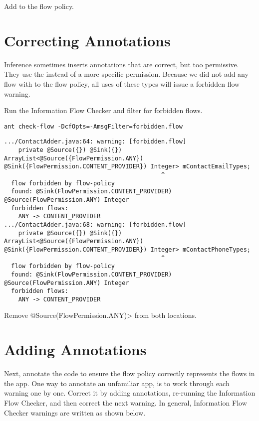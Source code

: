 Add   to the flow policy.

\section{Correcting Annotations}
Inference sometimes inserts annotations that are correct, but too permissive.  
They use the  instead of a more specific permission.  Because we did
not add any flow with  to the flow policy, all uses of these types will 
issue a forbidden flow warning.  

Run the Information Flow Checker and filter for forbidden flows.

\begin{Verbatim}
ant check-flow -DcfOpts=-AmsgFilter=forbidden.flow
\end{Verbatim}

\begin{Verbatim}
.../ContactAdder.java:64: warning: [forbidden.flow]
    private @Source({}) @Sink({}) ArrayList<@Source({FlowPermission.ANY}) @Sink({FlowPermission.CONTENT_PROVIDER}) Integer> mContactEmailTypes;
                                            ^
  flow forbidden by flow-policy
  found: @Sink(FlowPermission.CONTENT_PROVIDER) @Source(FlowPermission.ANY) Integer
  forbidden flows:
    ANY -> CONTENT_PROVIDER
.../ContactAdder.java:68: warning: [forbidden.flow]
    private @Source({}) @Sink({}) ArrayList<@Source({FlowPermission.ANY}) @Sink({FlowPermission.CONTENT_PROVIDER}) Integer> mContactPhoneTypes;
                                            ^
  flow forbidden by flow-policy
  found: @Sink(FlowPermission.CONTENT_PROVIDER) @Source(FlowPermission.ANY) Integer
  forbidden flows:
    ANY -> CONTENT_PROVIDER
\end{Verbatim}

Remove \<@Source({FlowPermission.ANY})> from both locations. 


\section{Adding Annotations}

Next, annotate the code to ensure the flow policy correctly represents the flows
in the app.  One way to annotate an unfamiliar app, is to work through each warning
one by one. Correct it by adding annotations, re-running the Information Flow Checker, 
and then correct the next warning.  In general, 
Information Flow Checker warnings are written as shown below.

